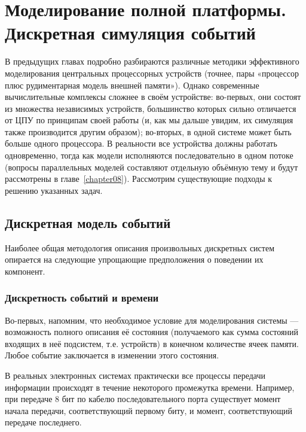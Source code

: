 \chapter[Моделирование полной платформы]{Моделирование полной платформы. Дискретная симуляция событий}\label{chapter07}


В предыдущих главах подробно разбираются различные методики эффективного моделирования центральных процессорных устройств (точнее, пары «процессор плюс рудиментарная модель внешней памяти»). Однако современные вычислительные комплексы сложнее в своём устройстве: во-первых, они  состоят из множества независимых устройств, большинство которых сильно отличается от ЦПУ по принципам своей работы (и, как мы дальше увидим, их симуляция также производится  другим образом); во-вторых, в одной системе может быть больше одного процессора. В реальности все устройства должны работать одновременно, тогда как модели исполняются последовательно в одном потоке (вопросы параллельных моделей составляют отдельную объёмную тему и будут рассмотрены в главе~\ref{chapter08}). Рассмотрим существующие подходы к решению указанных задач.

\section{Дискретная модель событий}

Наиболее общая методология описания произвольных дискретных систем опирается на следующие упрощающие предположения о поведении их компонент.

\subsection{Дискретность событий и времени}

Во-первых, напомним, что необходимое условие для моделирования системы --- возможность полного описания её состояния (получаемого как сумма состояний входящих в неё подсистем, т.е. устройств) в конечном количестве ячеек памяти. Любое событие заключается в изменении этого состояния.

В реальных электронных системах практически все процессы передачи информации происходят в течение некоторого промежутка времени. Например, при передаче 8 бит по кабелю последовательного порта существует момент начала передачи, соответствующий первому биту, и момент, соответствующий передаче последнего.

